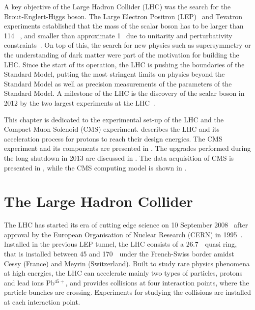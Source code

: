 
A key objective of the Large Hadron Collider (LHC) was the search for the Brout-Englert-Higgs boson. The Large  Electron Positron (LEP)~\cite{Myers:226776} and Tevatron~\cite{1748-0221-6-08-T08001} experiments established that the mass of the scalar boson has to be larger than 114 \GeV~\cite{Barate:2003sz,Herner:2016woc}, and smaller than approximate 1 \TeV\ due to unitarity and perturbativity constraints~\cite{Djouadi:2005gi}. On top of this, the search for new physics such as supersymmetry or the understanding of dark matter were part of the motivation for building the LHC. 
Since the start of its operation, the LHC is pushing the boundaries of the Standard Model, putting the most stringent limits on physics beyond the Standard Model as well as precision measurements of the parameters of the Standard Model. A milestone of the LHC is the discovery of the scalar boson in 2012 by the two largest experiments at the LHC~\cite{Chatrchyan:2012xdj,Aad:2012tfa}.

This chapter is dedicated to the experimental set-up of the LHC and the Compact  Muon Solenoid (CMS) experiment.  describes the LHC and its acceleration process for protons to reach their design energies. The CMS experiment and its components are presented in . The upgrades performed during the long shutdown in 2013 are discussed in . The data acquisition of CMS is presented in , while the CMS computing model is shown in .


\section{The Large Hadron Collider}
\label{sec:LHC}
The LHC has started its era of cutting edge science on 10 September 2008~\cite{LHC:2008} after approval by the European Organisation of Nuclear Research (CERN) in 1995~\cite{Pettersson:291782}. Installed in the previous LEP tunnel, the LHC consists of a 26.7~\km\ quasi ring, that is installed between 45 and 170~\m\ under the French-Swiss border amidst Cessy (France) and Meyrin (Switzerland). Built to study rare physics phenomena at high energies, the LHC  can accelerate mainly two types of particles, protons and lead ions Pb$^{45+}$, and provides collisions at four interaction points, where the particle bunches are crossing. Experiments for studying the collisions are installed at each interaction point. 

